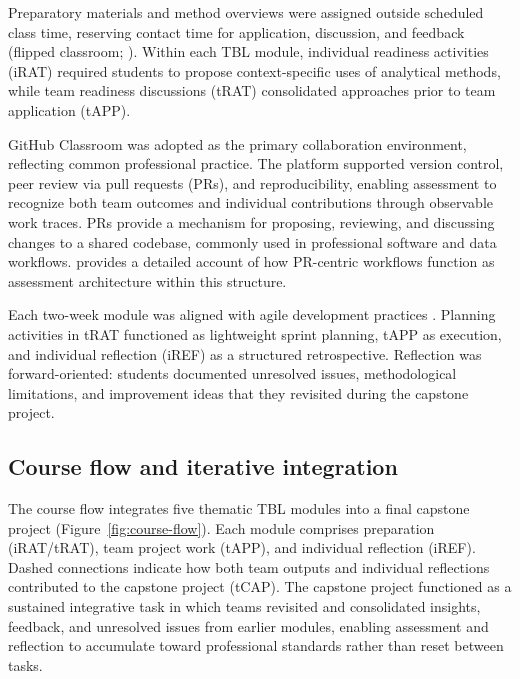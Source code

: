 Preparatory materials and method overviews were assigned outside scheduled class time, reserving contact time for application, discussion, and feedback (flipped classroom; \parencite{tucker2012flipped}). Within each TBL module, individual readiness activities (iRAT) required students to propose context-specific uses of analytical methods, 
while team readiness discussions (tRAT) consolidated approaches prior to team application (tAPP).

GitHub Classroom was adopted as the primary collaboration environment, reflecting common professional practice. The platform supported version control, peer review via pull requests (PRs), and reproducibility, enabling assessment to recognize both team outcomes and individual contributions through observable work traces. PRs provide a mechanism for proposing, reviewing, and discussing changes to a shared codebase, commonly used in professional software and data workflows. \textcite{Ingimundardottir2026PRassessment} provides a detailed account of how PR-centric workflows function as assessment architecture within this structure.

Each two-week module was aligned with agile development practices \parencite{schwaber2002agile}. Planning activities in tRAT functioned as lightweight sprint planning, tAPP as execution, and individual reflection (iREF) as a structured retrospective. Reflection was forward-oriented: students documented unresolved issues, methodological limitations, and improvement ideas that they revisited during the capstone project.

\subsection{Course flow and iterative integration}


The course flow integrates five thematic TBL modules into a final capstone project (Figure~\ref{fig:course-flow}). Each module comprises preparation (iRAT/tRAT), team project work (tAPP), and individual reflection (iREF). Dashed connections indicate how both team outputs and individual reflections contributed to the capstone project (tCAP). 
The capstone project functioned as a sustained integrative task in which teams revisited and consolidated insights, feedback, and unresolved issues from earlier modules, enabling assessment and reflection to accumulate toward professional standards rather than reset between tasks.

